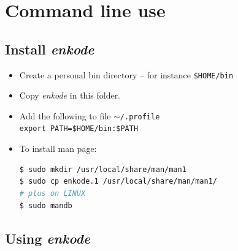 \section{Command line use}

\subsection{Install \textsl{enkode}}

\begin{itemize}
\item Create a personal bin directory -- for instance \texttt{\$HOME/bin}
\item Copy \textsl{enkode} in this folder.
\item Add the following to file \texttt{$\sim$/.profile}\\ 
\texttt{export PATH=\$HOME/bin:\$PATH}

\item To install man page:
\begin{lstlisting}[language=bash]
$ sudo mkdir /usr/local/share/man/man1
$ sudo cp enkode.1 /usr/local/share/man/man1/
# plus on LINUX
$ sudo mandb
\end{lstlisting}
\end{itemize}

\subsection{Using \textsl{enkode}}

